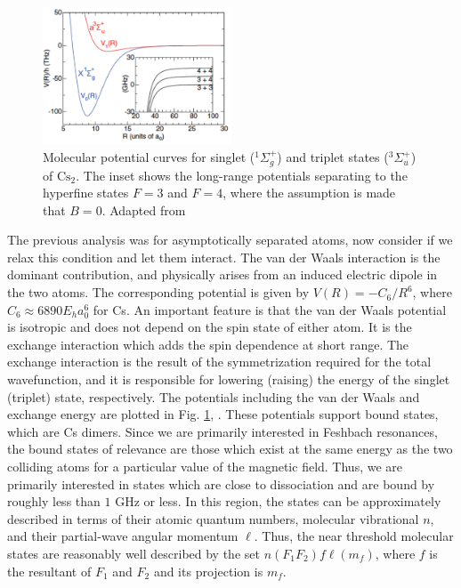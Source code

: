 \documentclass[prl,onecolumn,amsmath,amssymb,titlepage,nofootinbib,preprint]{revtex4-1}
\begin{document}
\begin{figure}
	\includegraphics[width=0.5\textwidth]{Figures/Potential_curves}
	\caption{Molecular potential curves for singlet ($^{1}\Sigma^{+}_{g}$) and triplet states ($^{3}\Sigma^{+}_{u}$) of $\text{Cs}_{2}$.  The inset shows the long-range potentials separating to the hyperfine states $F=3$ and $F=4$, where the assumption is made that $B=0$.  Adapted from \cite{Hutson2008}}
	\label{fig:born_oppenheimer_pots}
\end{figure}

The previous analysis was for asymptotically separated atoms, now consider if we relax this condition and let them interact.  The van der Waals interaction is the dominant contribution, and physically arises from an induced electric dipole in the two atoms. The corresponding potential is given by $V(R)=-C_{6}/R^{6}$, where $C_{6}\approx 6890 E_{h} a_{0}^{6}$ for Cs. An important feature is that the van der Waals potential is isotropic and does not depend on the spin state of either atom.  It is the exchange interaction which adds the spin dependence at short range.  The exchange interaction is the result of the symmetrization required for the total wavefunction, and it is responsible for lowering (raising) the energy of the singlet (triplet) state, respectively.  The potentials including the van der Waals and exchange energy are plotted in Fig. \ref{fig:born_oppenheimer_pots}, \cite{Chin2010}\cite{Chin2001}.  These potentials support bound states, which are Cs dimers.   Since we are primarily interested in Feshbach resonances, the bound states of relevance are those which exist at the same energy as the two colliding atoms for a particular value of the magnetic field.  Thus, we are primarily interested in states which are close to dissociation and are bound by roughly less than $1$ GHz or less.  In this region, the states can be approximately described in terms of their atomic quantum numbers, molecular vibrational $n$, and their partial-wave angular momentum $\ell$.  Thus, the near threshold molecular states are reasonably well described by the set $n(F_{1}F_{2})f\ell(m_{f})$, where $f$ is the resultant of $F_{1}$ and $F_{2}$ and its projection is $m_{f}$.  
\end{document}
